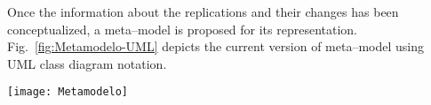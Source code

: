 Once the information about the replications and their changes has been conceptualized, a meta--model is proposed for its representation.
Fig.~\ref{fig:Metamodelo-UML} depicts the current version of meta--model using UML class diagram notation.

\begin{figure*}[h]
    \texttt{[image: Metamodelo]}
    \caption{Meta-model of replications and changes}
    \label{fig:Metamodelo-UML} 
\end{figure*}
